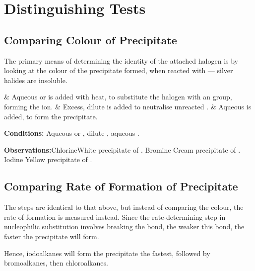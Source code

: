 

	\pagebreak
	\section{Distinguishing Tests}

		\subsection{Comparing Colour of Precipitate}
			The primary means of determining the identity of the attached halogen is by looking at the colour of the precipitate formed, when
			reacted with  –– silver halides are insoluble.

			\begin{numberedlist}
				&	Aqueous  or  is added with heat, to substitute the halogen with an  group, forming the  ion.
				&	Excess, dilute  is added to neutralise unreacted .
				&	Aqueous  is added, to form the  precipitate.
			\end{numberedlist}

			\vspace{1.5em}
			\vbox{\textbf{Conditions:}	\tabto{35mm}Aqueous  or , dilute , aqueous .}

			\vspace{0.75em}
			\vbox{\textbf{Observations:}\tabto{35mm}Chlorine\tabto{60mm}White precipitate of .
										\tabto{35mm}Bromine	\tabto{60mm}Cream precipitate of .
										\tabto{35mm}Iodine	\tabto{60mm}Yellow precipitate of .}

		\subsection{Comparing Rate of Formation of Precipitate}

			The steps are identical to that above, but instead of comparing the colour, the rate of formation is measured instead. Since the
			rate-determining step in nucleophilic substitution involves breaking the  bond, the weaker this bond, the faster the
			precipitate will form.

			Hence, iodoalkanes will form the precipitate the fastest, followed by bromoalkanes, then chloroalkanes.



